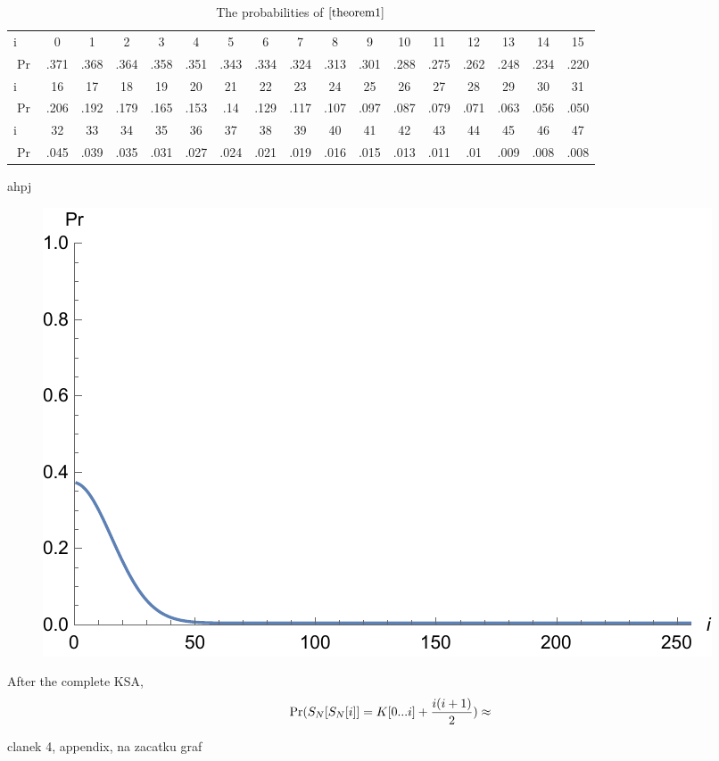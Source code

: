 	\begin{table}[h]		
		\setlength\tabcolsep{0.035cm}
		\begin{tabular}{l@{\hspace{0.5cm}}cccccccccccccccc}
			\toprule
			i	& 0 & 1&2&3&4&5&6&7&8&9&10&11&12&13&14&15 \\
			$ 	\Pr $	& .371&.368&.364&.358&.351&.343&.334&.324&.313&.301&.288&.275&.262&.248&.234&.220\\
			\hline
			i	& 16&17&18&19&20&21&22&23&24&25&26&27&28&29&30&31 \\
			$ 	\Pr  $&	.206&.192&.179&.165&.153&.14&.129&.117&.107&.097&.087&.079&.071&.063&.056&.050 \\	
			\hline
			i   & 32&33&34&35&36&37&38&39&40&41&42&43&44&45&46&47 \\
			$ 	\Pr $ & .045&.039&.035&.031&.027&.024&.021&.019&.016&.015&.013&.011&.01&.009&.008&.008 \\
			\bottomrule
			
		\end{tabular} 
		\caption{ The probabilities of $ \ref{theorem1} $}
		\label{table:theorem1}
	\end{table}

\begin{example}
	ahpj
\end{example}


	\begin{figure}
\centering
\includegraphics[width=0.7\linewidth]{img/theorem1}
\caption{}
\label{fig:theorem1}
\end{figure}






\begin{thm}
	After the complete KSA, 
	\[  \Pr(S_{N}[S_{N}[i]] = K[{0}...{i}] + \dfrac{i(i+1)}{2}) \approx  \]
	
	clanek 4, appendix, na zacatku graf
\end{thm}

